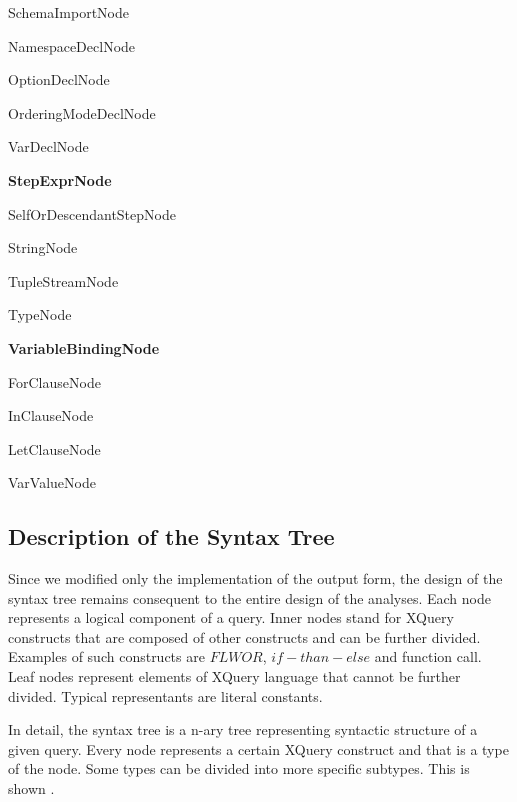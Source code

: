 \begin{description}
\begin{description}
\begin{description}
\begin{description}
    \item SchemaImportNode
    \end{description}
  \item NamespaceDeclNode
  \item OptionDeclNode
  \item OrderingModeDeclNode
  \item VarDeclNode
  \end{description}
\item \textbf{StepExprNode}
  \begin{description}
  \item SelfOrDescendantStepNode
  \end{description}
\item StringNode
\item TupleStreamNode
\item TypeNode
\item \textbf{VariableBindingNode}
  \begin{description}
  \item ForClauseNode
  \item InClauseNode
  \item LetClauseNode
  \end{description}
\item VarValueNode
\end{description}
\end{description}

\subsection{Description of the Syntax Tree}
Since we modified only the implementation of the output form, the design of the syntax tree remains consequent to the entire design of the analyses. Each node represents a logical component of a query. Inner nodes stand for XQuery constructs that are composed of other constructs and can be further divided. Examples of such constructs are $FLWOR$, $if-than-else$ and function call. Leaf nodes represent elements of XQuery language that cannot be further divided. Typical representants are literal constants. 


In detail, the syntax tree is a n-ary tree representing syntactic structure of a given query. Every node represents a certain XQuery construct and that is a type of the node. Some types can be divided into more specific subtypes. This is shown .

